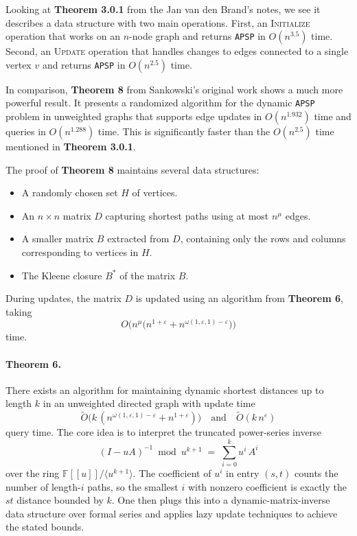 \documentclass[12pt]{article}
\begin{document}
Looking at \textbf{Theorem 3.0.1} from the Jan van den Brand's notes, we see it describes a data structure with two main operations. First, an \textsc{Initialize} operation that works on an $n$-node graph and returns \texttt{APSP} in $O(n^{3.5})$ time. Second, an \textsc{Update} operation that handles changes to edges connected to a single vertex $v$ and returns \texttt{APSP} in $O(n^{2.5})$ time.

In comparison, \textbf{Theorem 8} from Sankowski's original work shows a much more powerful result. It presents a randomized algorithm for the dynamic \texttt{APSP} problem in unweighted graphs that supports edge updates in $O(n^{1.932})$ time and queries in $O(n^{1.288})$ time. This is significantly faster than the $O(n^{2.5})$ time mentioned in \textbf{Theorem 3.0.1}.

The proof of \textbf{Theorem 8} maintains several data structures:
\begin{itemize}
    \item A randomly chosen set $H$ of vertices.
    \item An $n\times n$ matrix $D$ capturing shortest paths using at most $n^\mu$ edges.
    \item A smaller matrix $B$ extracted from $D$, containing only the rows and columns corresponding to vertices in $H$.
    \item The Kleene closure $B^*$ of the matrix $B$.
\end{itemize}
During updates, the matrix $D$ is updated using an algorithm from \textbf{Theorem 6}, taking
\[
    O\bigl(n^\mu \bigl(n^{1+\varepsilon} + n^{\omega(1,\varepsilon,1)-\varepsilon}\bigr)\bigr)
\]
time.

\paragraph{Theorem 6.}
There exists an algorithm for maintaining dynamic shortest distances up to length $k$ in an unweighted directed graph with update time
\[
    \tilde O\bigl(k\,(n^{\omega(1,\varepsilon,1)-\varepsilon} + n^{1+\varepsilon})\bigr)
    \quad\text{and}\quad
    \tilde O(k\,n^\varepsilon)
\]
query time. The core idea is to interpret the truncated power-series inverse
\[
    (I - uA)^{-1} \bmod u^{k+1}
    \;=\;
    \sum_{i=0}^{k} u^i\,A^i
\]
over the ring $\mathbb F[[u]]/\langle u^{k+1}\rangle$.  The coefficient of $u^i$ in entry $(s,t)$ counts the number of length-$i$ paths, so the smallest $i$ with nonzero coefficient is exactly the $s\!t$ distance bounded by $k$.  One then plugs this into a dynamic-matrix-inverse data structure over formal series and applies lazy update techniques to achieve the stated bounds.
\end{document}
